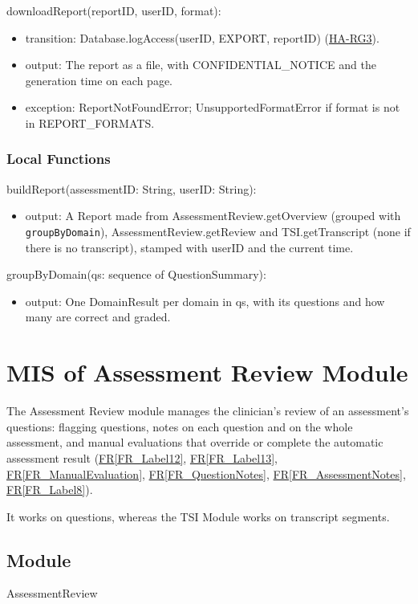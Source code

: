 \documentclass[12pt, titlepage]{article}
\newcommand{\srsref}[2]{\href{https://github.com/Nour-Fawaz/MacaBoca/blob/main/pdfs/SRS/SRS.pdf}{#1\ref*{#2}}}
\newcommand{\hazref}[1]{\href{https://github.com/Nour-Fawaz/MacaBoca/blob/main/pdfs/HazardAnalysis/HazardAnalysis.pdf}{#1}}
\begin{document}
\noindent downloadReport(reportID, userID, format):
\begin{itemize}
\item transition: Database.logAccess(userID, EXPORT, reportID) (\hazref{HA-RG3}).
\item output: The report as a file, with CONFIDENTIAL\_NOTICE and the generation time on each page.
\item exception: ReportNotFoundError; UnsupportedFormatError if format is not in REPORT\_FORMATS.
\end{itemize}

\subsubsection{Local Functions}

\noindent buildReport(assessmentID: String, userID: String):
\begin{itemize}
\item output: A Report made from AssessmentReview.getOverview (grouped with \texttt{groupByDomain}), AssessmentReview.getReview and TSI.getTranscript (none if there is no transcript), stamped with userID and the current time.
\end{itemize}

\noindent groupByDomain(qs: sequence of QuestionSummary):
\begin{itemize}
\item output: One DomainResult per domain in qs, with its questions and how many are correct and graded.
\end{itemize}

\newpage
\section{MIS of Assessment Review Module} \label{AssessmentReview}
The Assessment Review module manages the clinician's review of an assessment's questions: 
flagging questions, notes on each question and on the whole assessment, and manual evaluations 
that override or complete the automatic assessment result
(\srsref{FR}{FR_Label12}, \srsref{FR}{FR_Label13}, 
\srsref{FR}{FR_ManualEvaluation}, \srsref{FR}{FR_QuestionNotes}, 
\srsref{FR}{FR_AssessmentNotes}, \srsref{FR}{FR_Label8}). 

It works on questions, whereas the TSI Module works on transcript segments.

\subsection{Module}
AssessmentReview
\end{document}
